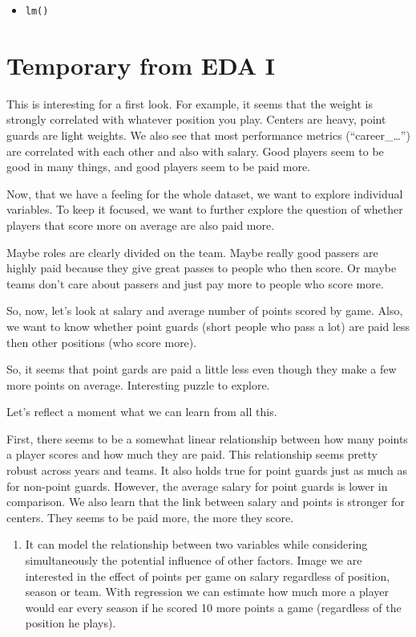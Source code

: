 \documentclass[
]{book}
\providecommand{\tightlist}{%
  \setlength{\itemsep}{0pt}\setlength{\parskip}{0pt}}
\begin{document}
\begin{itemize}
\tightlist
\item
  \texttt{lm()}
\end{itemize}

\hypertarget{temporary-from-eda-i}{%
\section{Temporary from EDA I}\label{temporary-from-eda-i}}

This is interesting for a first look. For example, it seems that the weight is
strongly correlated with whatever position you play. Centers are heavy, point
guards are light weights.
We also see that most performance metrics (``career\_\ldots{}'') are correlated with each
other and also with salary. Good players seem to be good in many things, and
good players seem to be paid more.

Now, that we have a feeling for the whole dataset, we want to explore individual
variables. To keep it focused, we want to further explore the question
of whether players that score more on average are also paid more.

Maybe roles are clearly divided on the team. Maybe really good passers are highly
paid because they give great passes to people who then score. Or maybe teams
don't care about passers and just pay more to people who score more.

So, now, let's look at salary and average number of points scored by game.
Also, we want to know whether point guards (short people who pass a lot) are
paid less then other positions (who score more).

So, it seems that point gards are paid a little less even though they make a few more points on average. Interesting puzzle to explore.

Let's reflect a moment what we can learn from all this.

First, there seems to be a somewhat linear relationship between how many points
a player scores and how much they are paid. This relationship seems pretty robust across years and teams. It also holds true for point guards just as much as for non-point guards. However, the average salary for point guards is lower in comparison. We also learn that the link between salary and points is stronger for centers. They seems to be paid more, the more they score.

\begin{enumerate}
\def\labelenumi{\arabic{enumi})}
\tightlist
\item
  It can model the relationship between two variables while considering simultaneously the potential influence of other factors. Image we are interested
  in the effect of points per game on salary regardless of position, season or team.
  With regression we can estimate how much more a player would ear every season
  if he scored 10 more points a game (regardless of the position he plays).
\end{enumerate}
\end{document}
